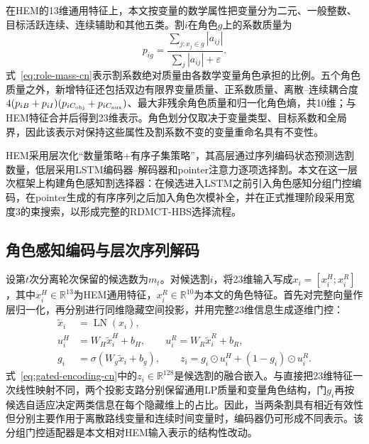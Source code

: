 \documentclass[final,5p,times,twocolumn]{elsarticle}
\begin{document}
在HEM的13维通用特征上，本文按变量的数学属性把变量分为二元、一般整数、目标活跃连续、连续辅助和其他五类。割$i$在角色$g$上的系数质量为
\begin{equation}
p_{ig}=\frac{\sum_{j:x_j\in g}|a_{ij}|}{\sum_j|a_{ij}|+\varepsilon}.
\label{eq:role-mass-cn}
\end{equation}
式~\eqref{eq:role-mass-cn}表示割系数绝对质量由各数学变量角色承担的比例。五个角色质量之外，新增特征还包括双边有限界变量质量、正系数质量、离散--连续耦合度$4(p_{iB}+p_{iI})(p_{iC_{\rm obj}}+p_{iC_{\rm aux}})$、最大非残余角色质量和归一化角色熵，共10维；与HEM特征合并后得到23维表示。角色划分仅取决于变量类型、目标系数和全局界，因此该表示对保持这些属性及割系数不变的变量重命名具有不变性。

HEM采用层次化“数量策略+有序子集策略”，其高层通过序列编码状态预测选割数量，低层采用LSTM编码器--解码器和pointer注意力逐项选择割\citep{wang2023hem,vinyals2015pointer}。本文在这一层次框架上构建角色感知割选择器：在候选进入LSTM之前引入角色感知分组门控编码，在pointer生成的有序序列之后加入角色次模补全，并在正式推理阶段采用宽度3的束搜索，以形成完整的RDMCT-HBS选择流程。


\subsection{角色感知编码与层次序列解码}

设第$t$次分离轮次保留的候选数为$m_t$。对候选割$i$，将23维输入写成$x_i=[x_i^{H};x_i^{R}]$，其中$x_i^{H}\in\mathbb R^{13}$为HEM通用特征，$x_i^{R}\in\mathbb R^{10}$为本文的角色特征。首先对完整向量作层归一化，再分别进行同维隐藏空间投影，并用完整23维信息生成逐维门控：
\begin{equation}
\begin{aligned}
\widetilde x_i&=\operatorname{LN}(x_i),\\
u_i^{H}&=W_H\widetilde x_i^{H}+b_H,\qquad
u_i^{R}=W_R\widetilde x_i^{R}+b_R,\\
g_i&=\sigma(W_g\widetilde x_i+b_g),\qquad
z_i=g_i\odot u_i^{H}+(1-g_i)\odot u_i^{R}.
\end{aligned}
\label{eq:gated-encoding-cn}
\end{equation}
式~\eqref{eq:gated-encoding-cn}中的$z_i\in\mathbb R^{128}$是候选割的融合嵌入。与直接把23维特征一次线性映射不同，两个投影支路分别保留通用LP质量和变量角色结构，门$g_i$再按候选自适应决定两类信息在每个隐藏维上的占比。因此，当两条割具有相近有效性但分别主要作用于离散路线变量和连续时间变量时，编码器仍可形成不同表示。该分组门控适配器是本文相对HEM输入表示的结构性改动。
\end{document}
